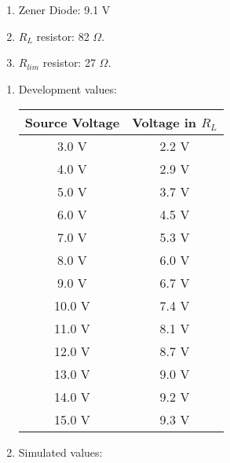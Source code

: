 \begin{tasks}
\begin{enumerate}
\item Zener Diode: 9.1 V
\item $R_{L}$ resistor: 82 $\Omega$.
\item $R_{lim}$ resistor: 27 $\Omega$.
\end{enumerate}

\begin{multicols}{2}
\begin{enumerate}
\item Development values:

\begin{center}
\begin{tabular}[.5cm]{ c c }
\toprule
Source Voltage & Voltage in $R_{L}$ \\
\midrule
3.0 V & 2.2 V \\
\cmidrule{1-2}
4.0 V & 2.9 V \\
\cmidrule{1-2}
5.0 V & 3.7 V \\
\cmidrule{1-2}
6.0 V & 4.5 V \\
\cmidrule{1-2}
7.0 V & 5.3 V \\
\cmidrule{1-2}
8.0 V & 6.0 V \\
\cmidrule{1-2}
9.0 V & 6.7 V \\
\cmidrule{1-2}
10.0 V & 7.4 V \\
\cmidrule{1-2}
11.0 V & 8.1 V \\
\cmidrule{1-2}
12.0 V & 8.7 V \\
\cmidrule{1-2}
13.0 V & 9.0 V \\
\cmidrule{1-2}
14.0 V & 9.2 V \\
\cmidrule{1-2}
15.0 V & 9.3 V \\
\bottomrule
\end{tabular}
\end{center}

\item Simulated values:


\end{enumerate}
\end{multicols}
\end{tasks}
